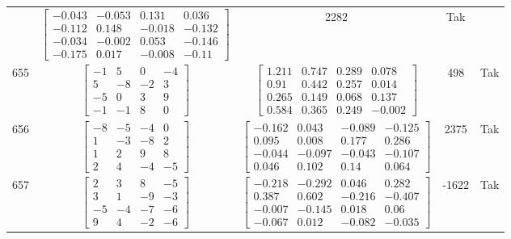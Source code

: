 \documentclass[a4paper,12pt]{article}
\begin{document}
\begin{tabular}{c c c c c}
&
$\begin{bmatrix} -0.043 & -0.053 & 0.131 & 0.036 \\ -0.112 & 0.148 & -0.018 & -0.132 \\ -0.034 & -0.002 & 0.053 & -0.146 \\ -0.175 & 0.017 & -0.008 & -0.11 \end{bmatrix}$
&
2282
&
Tak
\\
655
&
$\begin{bmatrix} -1 & 5 & 0 & -4 \\ 5 & -8 & -2 & 3 \\ -5 & 0 & 3 & 9 \\ -1 & -1 & 8 & 0 \end{bmatrix}$
&
$\begin{bmatrix} 1.211 & 0.747 & 0.289 & 0.078 \\ 0.91 & 0.442 & 0.257 & 0.014 \\ 0.265 & 0.149 & 0.068 & 0.137 \\ 0.584 & 0.365 & 0.249 & -0.002 \end{bmatrix}$
&
498
&
Tak
\\
656
&
$\begin{bmatrix} -8 & -5 & -4 & 0 \\ 1 & -3 & -8 & 2 \\ 1 & 2 & 9 & 8 \\ 2 & 4 & -4 & -5 \end{bmatrix}$
&
$\begin{bmatrix} -0.162 & 0.043 & -0.089 & -0.125 \\ 0.095 & 0.008 & 0.177 & 0.286 \\ -0.044 & -0.097 & -0.043 & -0.107 \\ 0.046 & 0.102 & 0.14 & 0.064 \end{bmatrix}$
&
2375
&
Tak
\\
657
&
$\begin{bmatrix} 2 & 3 & 8 & -5 \\ 3 & 1 & -9 & -3 \\ -5 & -4 & -7 & -6 \\ 9 & 4 & -2 & -6 \end{bmatrix}$
&
$\begin{bmatrix} -0.218 & -0.292 & 0.046 & 0.282 \\ 0.387 & 0.602 & -0.216 & -0.407 \\ -0.007 & -0.145 & 0.018 & 0.06 \\ -0.067 & 0.012 & -0.082 & -0.035 \end{bmatrix}$
&
-1622
&
Tak
\\

\end{tabular}
\end{document}
